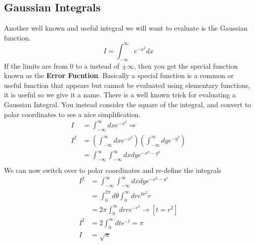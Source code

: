 \documentclass{article}
\newcommand{\be}{\begin{equation}}
\newcommand{\ee}{\end{equation}}
\begin{document}
\subsection*{Gaussian Integrals}
Another well known and useful integral we will want to evaluate is the Gaussian function.
\be
I = \int_{-\infty}^\infty e^{-x^2} dx
\ee
If the limits are from 0 to a instead of $\pm \infty$, then you get the special function known as the \textbf{Error Fucntion}.
Basically a special function is a common or useful function that appears but cannot be evaluated using elementary functions, it is useful so we give it a name.
There is a well known trick for evaluating a Gaussian Integral.
You instead consider the square of the integral, and convert to polar coordinates to see a nice simplification.
\be
\begin{split}
	I &= \int_{-\infty}^\infty dx e^{-x^2} \Rightarrow \\
	I^2 &= \left(\int_{-\infty}^\infty dx e^{-x^2}\right) \left(\int_{-\infty}^\infty dy e^{-y^2}\right) \\
	 &= \int_{-\infty}^\infty \int_{-\infty}^\infty dxdy e^{-x^2 - y^2} \\
\end{split}
\ee
We can now switch over to polar coordinates and re-define the integrals
\be
\begin{split}
	 I^2 &= \int_{-\infty}^\infty \int_{-\infty}^\infty dxdy e^{-x^2 - y^2} \\
	 &= \int_0^{2\pi} d\theta \int_0^\infty dr e^{0r^2}r \\
	 &= 2\pi \int_0^\infty dr re^{-r^2} \rightarrow[t=r^2]\\
	 I^2&= 2 \int_0^\infty dt e^{-t} = \pi \\
	 I &= \sqrt{\pi}
\end{split}
\ee
\end{document}
